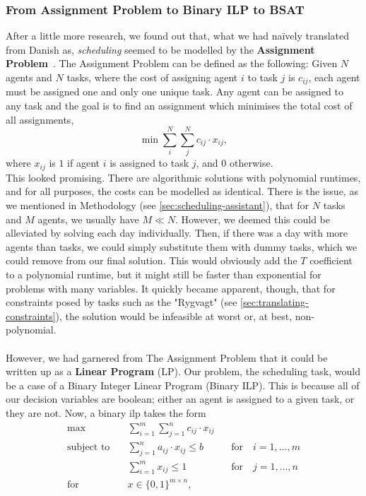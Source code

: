 \subsubsection*{From Assignment Problem to Binary ILP to BSAT}
After a little more research, we found out that, what we had na\"ively translated from Danish as, \emph{scheduling} seemed to be modelled by the \textbf{Assignment Problem}~\cite{Wiki-assignment-prob}. The Assignment Problem can be defined as the following: Given \(N\) agents and \(N\) tasks, where the cost of assigning agent \(i\) to task \(j\) is \(c_{ij}\), each agent must be assigned one and only one unique task. Any agent can be assigned to any task and the goal is to find an assignment which minimises the total cost of all assignments,
\begin{equation*}
    \min \sum_{i}^N \sum_{j}^N c_{ij} \cdot x_{ij},
\end{equation*}
where \(x_{ij}\) is \(1\) if agent \(i\) is assigned to task \(j\), and \(0\) otherwise.
\\
This looked promising. There are algorithmic solutions with polynomial runtimes, and for all purposes, the costs can be modelled as identical. There is the issue, as we mentioned in Methodology (see \autoref{sec:scheduling-assistant}), that for \(N\) tasks and \(M\) agents, we usually have \(M \ll N\). However, we deemed this could be alleviated by solving each day individually. Then, if there was a day with more agents than tasks, we could simply substitute them with dummy tasks, which we could remove from our final solution. This would obviously add the \(T\) coefficient to a polynomial runtime, but it might still be faster than exponential for problems with many variables. It quickly became apparent, though, that for constraints posed by tasks such as the "Rygvagt" (see \autoref{sec:translating-constraints}), the solution would be infeasible at worst or, at best, non-polynomial.
\\
\\
However, we had garnered from The Assignment Problem that it could be written up as a \textbf{Linear Program}\cite{OR-Intro-Book} (LP). Our problem, the scheduling task, would be a case of a Binary Integer Linear Program (Binary ILP). This is because all of our decision variables are boolean; either an agent is assigned to a given task, or they are not.
Now, a binary \acrshort{ilp} takes the form\cite{Integer-Programming-Book} 
\begin{equation}\label{eq:binary-ILP}
    \begin{aligned}
    \max \quad &\sum_{i = 1}^m \sum_{j = 1}^n c_{ij} \cdot x_{ij}
    \\
    \text{subject to} \quad &\sum_{j = 1}^n a_{ij} \cdot x_{ij} \leq b \qquad &\text{for} \quad i = 1, \hdots, m
    \\
    &\sum_{i = 1}^m x_{ij} \leq 1 \qquad &\text{for} \quad j = 1, \hdots, n
    \\
    \text{for} \quad &x \in \{0, 1\}^{m \times n},
    \end{aligned}
\end{equation}
